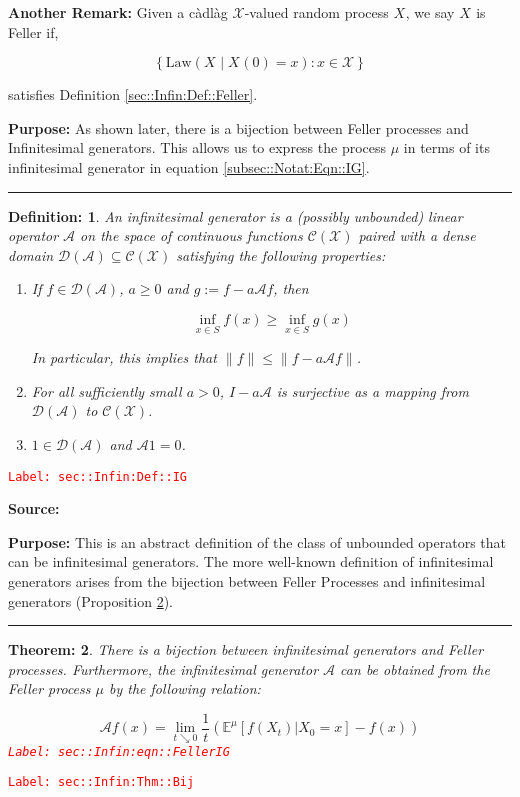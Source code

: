 \documentclass[12pt]{article}
\newcommand{\mb}{\mathbb}
\newcommand{\mc}{\mathcal}
\newcommand{\te}{\text}
\newcommand{\tr}{\textcolor{red}}
\newcommand{\labe}[1]{\tr{\texttt{Label: #1}}}
\newcommand{\purpose}{\textbf{Purpose: }}
\newcommand{\lin}{\rule{\linewidth}{0.4 pt}}
\newcommand{\x}{x}								%
\newcommand{\IG}{\mc{A}}						%
\newcommand{\law}{\te{Law}}							%
\newcommand{\rxvt}[2]{X_{#1}{(#2)}}					%
\newcommand{\rxvts}[2]{X_{#1}{#2}}					%
\newtheorem{thms}{Theorem: }[section]
\newtheorem{defn}[thms]{Definition: }
\begin{document}
\textbf{Another Remark: } Given a c\`adl\`ag \(\mc{X}\)-valued random process \(\rxvts{}{}\), we say \(\rxvts{}{}\) is Feller if,

\[\left\{\law\left(\rxvts{}{}\middle|\rxvt{}{0} = \x{}{}\right): \x{}{} \in \mc{X}\right\}\]

satisfies Definition \ref{sec::Infin:Def::Feller}.

\purpose As shown later, there is a bijection between Feller processes and Infinitesimal generators. This allows us to express the process \(\mu\) in terms of its infinitesimal generator in equation \eqref{subsec::Notat:Eqn::IG}.

\lin

\begin{defn}
An infinitesimal generator is a (possibly unbounded) linear operator \(\IG{}\) on the space of continuous functions \(\mc{C}(\mc{X})\) paired with a dense domain \(\mc{D}(\IG{}) \subseteq \mc{C}(\mc{X})\) satisfying the following properties:

\begin{enumerate}
\item If \(f \in \mc{D}(\IG{})\), \(a \geq 0\) and \(g:= f - a\IG{} f\), then 

\[\inf_{x \in S} f(x) \geq \inf_{x \in S} g(x)\]

\noindent In particular, this implies that \(\|f\| \leq \|f - a\IG{} f\|\).

\item For all sufficiently small \(a > 0\), \(I - a\IG{}\) is surjective as a mapping from \(\mc{D}(\IG{})\) to \(\mc{C}(\mc{X})\).

\item \(1 \in \mc{D}(\IG{})\) and \(\IG{} 1 = 0\).
\end{enumerate}
\label{sec::Infin:Def::IG}
\end{defn}
\labe{sec::Infin:Def::IG}

\textbf{Source: }\cite[Definitions 2.1,2.7]{Lig85}

\purpose This is an abstract definition of the class of unbounded operators that can be infinitesimal generators. The more well-known definition of infinitesimal generators arises from the bijection between Feller Processes and infinitesimal generators (Proposition \ref{sec::Infin:Thm::Bij}).

\lin

\begin{thms}
There is a bijection between infinitesimal generators and Feller processes. Furthermore, the infinitesimal generator \(\IG{}\) can be obtained from the Feller process \(\mu\) by the following relation:

\begin{equation}
\mc{A}f(x) = \lim_{t\searrow 0} \frac{1}{t}\left(\mb{E}^\mu[f(X_t)|X_0=x] - f(x)\right)
\label{sec::Infin:eqn::FellerIG}
\end{equation}
\labe{sec::Infin:eqn::FellerIG}
\label{sec::Infin:Thm::Bij}
\end{thms}
\labe{sec::Infin:Thm::Bij}
\end{document}

